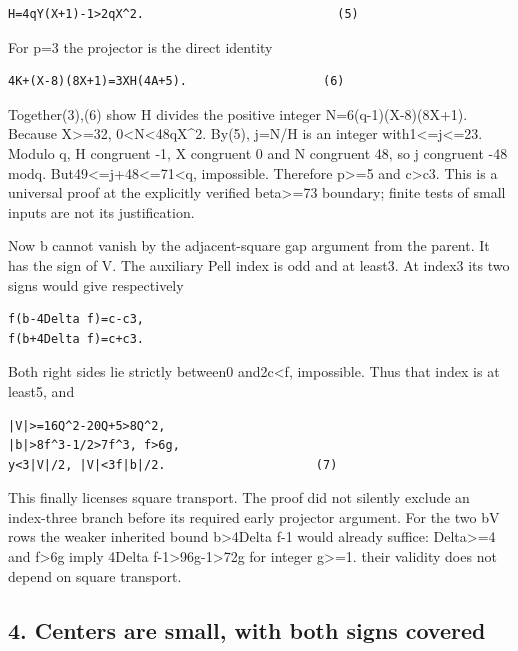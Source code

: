\begin{verbatim}
H=4qY(X+1)-1>2qX^2.                           (5)
\end{verbatim}

For p=3 the projector is the direct identity

\begin{verbatim}
4K+(X-8)(8X+1)=3XH(4A+5).                   (6)
\end{verbatim}

Together(3),(6) show H divides the positive integer N=6(q-1)(X-8)(8X+1).
Because X\textgreater=32, 0\textless N\textless48qX\^{}2. By(5), j=N/H
is an integer with1\textless=j\textless=23. Modulo q, H congruent -1, X
congruent 0 and N congruent 48, so j congruent -48 modq.
But49\textless=j+48\textless=71\textless q, impossible. Therefore
p\textgreater=5 and c\textgreater c3. This is a universal proof at the
explicitly verified beta\textgreater=73 boundary; finite tests of small
inputs are not its justification.

Now b cannot vanish by the adjacent-square gap argument from the parent.
It has the sign of V. The auxiliary Pell index is odd and at least3. At
index3 its two signs would give respectively

\begin{verbatim}
f(b-4Delta f)=c-c3,
f(b+4Delta f)=c+c3.
\end{verbatim}

Both right sides lie strictly between0 and2c\textless f, impossible.
Thus that index is at least5, and

\begin{verbatim}
|V|>=16Q^2-20Q+5>8Q^2,
|b|>8f^3-1/2>7f^3, f>6g,
y<3|V|/2, |V|<3f|b|/2.                     (7)
\end{verbatim}

This finally licenses square transport. The proof did not silently
exclude an index-three branch before its required early projector
argument. For the two bV rows the weaker inherited bound
\textbar b\textbar\textgreater4Delta f-1 would already suffice:
Delta\textgreater=4 and f\textgreater6g imply 4Delta
f-1\textgreater96g-1\textgreater72g for integer g\textgreater=1. their
validity does not depend on square transport.

\subsection{4. Centers are small, with both signs
covered}\label{centers-are-small-with-both-signs-covered}

